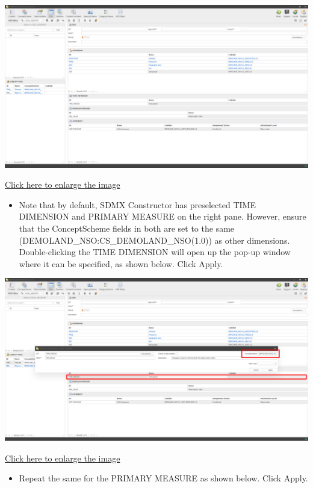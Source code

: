 \documentclass[
]{book}
\providecommand{\tightlist}{%
  \setlength{\itemsep}{0pt}\setlength{\parskip}{0pt}}
\begin{document}
\begin{center}\includegraphics[width=1\linewidth]{./images/image251} \end{center}

\href{images/image251.png}{Click here to enlarge the image}

\begin{itemize}
\tightlist
\item
  Note that by default, SDMX Constructor has preselected TIME DIMENSION and PRIMARY MEASURE on the right pane. However, ensure that the ConceptScheme fields in both are set to the same (DEMOLAND\_NSO:CS\_DEMOLAND\_NSO(1.0)) as other dimensions. Double-clicking the TIME DIMENSION will open up the pop-up window where it can be specified, as shown below. Click Apply.
\end{itemize}

\begin{center}\includegraphics[width=1\linewidth]{./images/image252} \end{center}

\href{images/image252.png}{Click here to enlarge the image}

\begin{itemize}
\tightlist
\item
  Repeat the same for the PRIMARY MEASURE as shown below. Click Apply.
\end{itemize}
\end{document}
